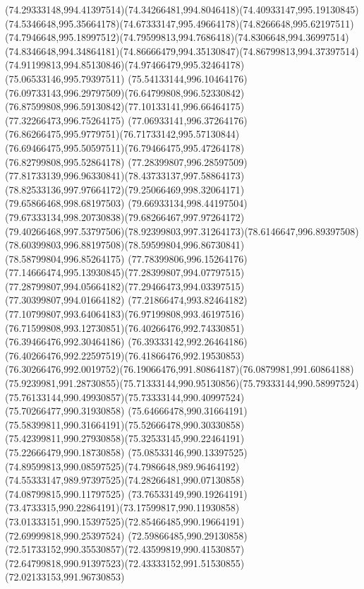 {{		\curveto(74.29333148,994.41397514)(74.34266481,994.8046418)(74.40933147,995.19130845)
		\curveto(74.5346648,995.35664178)(74.67333147,995.49664178)(74.8266648,995.62197511)
		\curveto(74.7946648,995.18997512)(74.79599813,994.7686418)(74.8306648,994.36997514)
		\curveto(74.8346648,994.34864181)(74.86666479,994.35130847)(74.86799813,994.37397514)
		\curveto(74.91199813,994.85130846)(74.97466479,995.32464178)(75.06533146,995.79397511)
		\curveto(75.54133144,996.10464176)(76.09733143,996.29797509)(76.64799808,996.52330842)
		\curveto(76.87599808,996.59130842)(77.10133141,996.66464175)(77.32266473,996.75264175)
		\curveto(77.06933141,996.37264176)(76.86266475,995.9779751)(76.71733142,995.57130844)
		\curveto(76.69466475,995.50597511)(76.79466475,995.47264178)(76.82799808,995.52864178)
		\curveto(77.28399807,996.28597509)(77.81733139,996.96330841)(78.43733137,997.58864173)
		\curveto(78.82533136,997.97664172)(79.25066469,998.32064171)(79.65866468,998.68197503)
		\curveto(79.66933134,998.44197504)(79.67333134,998.20730838)(79.68266467,997.97264172)
		\curveto(79.40266468,997.53797506)(78.92399803,997.31264173)(78.6146647,996.89397508)
		\curveto(78.60399803,996.88197508)(78.59599804,996.86730841)(78.58799804,996.85264175)
		\curveto(77.78399806,996.15264176)(77.14666474,995.13930845)(77.28399807,994.07797515)
		\curveto(77.28799807,994.05664182)(77.29466473,994.03397515)(77.30399807,994.01664182)
		\curveto(77.21866474,993.82464182)(77.10799807,993.64064183)(76.97199808,993.46197516)
		\curveto(76.71599808,993.12730851)(76.40266476,992.74330851)(76.39466476,992.30464186)
		\curveto(76.39333142,992.26464186)(76.40266476,992.22597519)(76.41866476,992.19530853)
		\curveto(76.30266476,992.0019752)(76.19066476,991.80864187)(76.0879981,991.60864188)
		\curveto(75.9239981,991.28730855)(75.71333144,990.95130856)(75.79333144,990.58997524)
		\curveto(75.76133144,990.49930857)(75.73333144,990.40997524)(75.70266477,990.31930858)
		\curveto(75.64666478,990.31664191)(75.58399811,990.31664191)(75.52666478,990.30330858)
		\curveto(75.42399811,990.27930858)(75.32533145,990.22464191)(75.22666479,990.18730858)
		\curveto(75.08533146,990.13397525)(74.89599813,990.08597525)(74.7986648,989.96464192)
		\curveto(74.55333147,989.97397525)(74.28266481,990.07130858)(74.08799815,990.11797525)
		\curveto(73.76533149,990.19264191)(73.4733315,990.22864191)(73.17599817,990.11930858)
		\curveto(73.01333151,990.15397525)(72.85466485,990.19664191)(72.69999818,990.25397524)
		\curveto(72.59866485,990.29130858)(72.51733152,990.35530857)(72.43599819,990.41530857)
		\curveto(72.64799818,990.91397523)(72.43333152,991.51530855)(72.02133153,991.96730853)
}}
